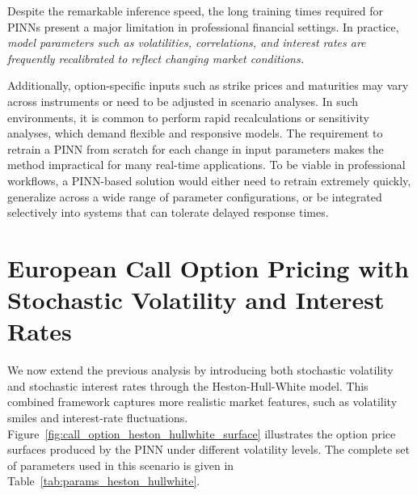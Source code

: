 \documentclass[12pt]{report} %
\theoremstyle{plain} %
\theoremstyle{definition} %
\theoremstyle{remark} %
\begin{document}
Despite the remarkable inference speed, the long training times required for PINNs present a 
major limitation in professional financial settings. In practice, \emph{model parameters such 
as volatilities, correlations, and interest rates are frequently recalibrated to reflect changing market conditions.} 

Additionally, option-specific inputs such as strike prices and maturities may vary across instruments 
or need to be adjusted in scenario analyses. In such environments, it is common to perform rapid 
recalculations or sensitivity analyses, which demand flexible and responsive models. The requirement to 
retrain a PINN from scratch for each change in input parameters makes the method impractical for 
many real-time applications. To be viable in professional workflows, a PINN-based solution 
would either need to retrain extremely quickly, generalize across a wide range of 
parameter configurations, or be integrated selectively into systems that can tolerate delayed response times.

\section{European Call Option Pricing with Stochastic Volatility and Interest Rates}

We now extend the previous analysis by introducing both stochastic volatility 
and stochastic interest rates through the Heston-Hull-White model. 
This combined framework captures more realistic market features, such as 
volatility smiles and interest-rate fluctuations. 
Figure~\ref{fig:call_option_heston_hullwhite_surface} illustrates the 
option price surfaces produced by the PINN under different volatility levels. 
The complete set of parameters used in this scenario is given in 
Table~\ref{tab:params_heston_hullwhite}.
\end{document}
